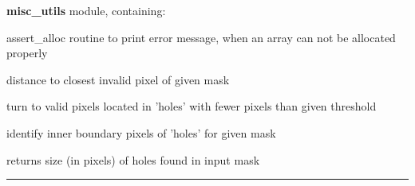 \begin{modules}
  \begin{sulist}{} %
  \item[\textbf{misc\_utils}] module, containing:
  \item[assert\_alloc] routine to print error message, when an array can not be
  allocated properly
  \end{sulist}
\end{modules}

\begin{related}
  \begin{sulist}{} %
	\item[\htmlref{dist2holes\_nest}{sub:dist2holes_nest}] distance to
closest invalid pixel of given mask
	\item[\htmlref{fill\_holes\_nest}{sub:fill_holes_nest}] turn to valid
pixels located in 'holes' with fewer pixels than given threshold
	\item[\htmlref{maskborder\_nest}{sub:maskborder_nest}] identify inner
boundary pixels of 'holes' for given mask
	\item[\htmlref{size\_holes\_nest}{sub:size_holes_nest}] returns size (in
pixels) of holes found in input mask
  \end{sulist}
\end{related}

\rule{\hsize}{2mm}

\newpage
